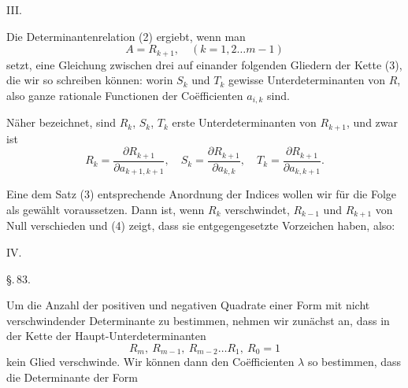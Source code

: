 
III.\ 

Die Determinantenrelation (2) ergiebt, wenn man
\[
A = R_{k+1}, \quad (k = 1, 2 \ldots m-1)
\]
setzt, eine Gleichung zwischen drei auf einander folgenden Gliedern der Kette (3), die wir so schreiben können:
worin $S_k$ und $T_k$ gewisse Unterdeterminanten von $R$, also ganze rationale Functionen der Co\"efficienten $a_{i,k}$ sind.

Näher bezeichnet, sind $R_k$, $S_k$, $T_k$ erste Unterdeterminanten von $R_{k+1}$, und zwar ist
\[
R_k = \frac{\partial R_{k+1}}{\partial a_{k+1,k+1}}, \quad S_k = \frac{\partial R_{k+1}}{\partial a_{k,k}}, \quad T_k = \frac{\partial R_{k+1}}{\partial a_{k,k+1}}.
\]

Eine dem Satz (3) entsprechende Anordnung der Indices wollen wir für die Folge als gewählt voraussetzen. Dann ist, wenn $R_k$ verschwindet, $R_{k-1}$ und $R_{k+1}$ von Null verschieden und (4) zeigt, dass sie entgegengesetzte Vorzeichen haben, also:

IV.\ 

\begin{center}
\S.\,83.\\[4pt]
\end{center}

Um die Anzahl der positiven und negativen Quadrate einer Form mit nicht verschwindender Determinante zu bestimmen, nehmen wir zunächst an, dass in der Kette der Haupt-Unterdeterminanten
\[
R_m,\ R_{m-1},\ R_{m-2} \ldots R_1,\ R_0 = 1
\]
kein Glied verschwinde. Wir können dann den Co\"efficienten $\lambda$ so bestimmen, dass die Determinante der Form
